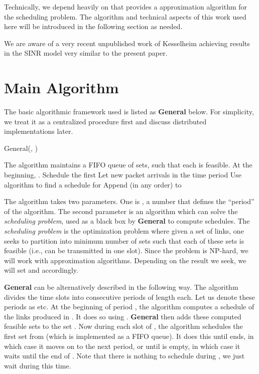 \documentclass[11pt]{amsart}
\newcommand{\alg}[1]{\textbf{#1}}
\begin{document}
Technically, we depend heavily on \cite{KV10} that provides a  approximation algorithm for the scheduling problem. The algorithm and technical aspects of this work used here will be introduced in the following section as needed.

We are aware of a very recent unpublished work of Kesselheim \cite{dynamickesselheim} achieving results in the SINR model very similar to the present paper.

\section{Main Algorithm}
\label{sublin}


The basic algorithmic framework used is listed as \alg{General} below. For simplicity,
we treat it as a centralized procedure first and discuss distributed implementations later.

\begin{algorithm}                      \caption{General(, )}          \begin{algorithmic}[1]                    \STATE The algorithm maintains a FIFO queue  of sets, such that each  is feasible. 
     \STATE At the beginning, .
         \STATE Schedule the first          
         \STATE 
       \ENDIF
       \IF{}
	\STATE Let  new packet arrivals in the time period 
	\STATE 
	\STATE Use algorithm  to find 	   a schedule  for 
	\STATE Append  (in any order) to 
	\ENDIF
       \ENDFOR
\end{algorithmic}
\label{alg1fig}
\end{algorithm}



The algorithm takes two parameters. One is , a number that defines the ``period''
of the algorithm. The second parameter is  an algorithm  which can
solve the \emph{scheduling problem}, used
as a black box by \alg{General} to compute schedules. The \emph{scheduling problem} is the optimization
problem where given a set  of links, one seeks to partition  into minimum number of sets such
that each of these sets is feasible (i.e., can be transmitted in one slot). Since the problem is NP-hard,
we will work with approximation algorithms. Depending on the result we seek, we will set  and 
accordingly.

\alg{General} can be alternatively described in the following way. The algorithm divides 
the time slots into consecutive
periods of length  each. Let us denote these periods as  etc.
At the beginning of period , the algorithm
computes a schedule  of the links produced in . It does so using
. \alg{General} then adds these computed feasible sets to the set . 
Now during each slot of , the algorithm schedules
the first set from  (which is implemented as a FIFO queue). 
It does this until  ends, in which case it moves on to the next period, or
until   is empty, in which case it waits until the end of . Note that there is
nothing to schedule during , we just wait during this time. 
\end{document}
